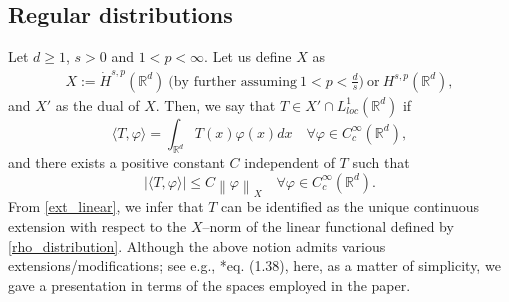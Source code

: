 \documentclass[letterpaper, 11pt,  reqno]{amsart}
\theoremstyle{definition}
\theoremstyle{remark}
\numberwithin{equation}{section}
\newcommand{\bbr}{\mathbb{R}}
\newcommand{\R}{{\mathbb R}}
\begin{document}
	\subsection*{Regular distributions}
	\noindent
	Let $d\ge 1$, $s>0$ and $1<p<\infty$. Let us define $X$ as 
	\begin{align}\label{X}
	{X}:= \dot H^{s,p}(\R^d)\ \big(\text{by further assuming}\ 1<p<\tfrac{d}{s}\big)\ \text{or}\ H^{s,p}(\R^d),
	\end{align}
and $X'$ as the dual of $X$. Then, we say that $T\in X{'}\cap L^{1}_{loc}(\R^d)$ if 
	\begin{equation}\label{rho_distribution}
		\langle T,\varphi\rangle=\int_{\bbr^d}T(x)\varphi(x)dx\quad \forall \varphi\in C^{\infty}_c(\bbr^d),
	\end{equation}
and there exists a positive constant $C$ independent of $T$ such that
	\begin{equation}\label{ext_linear}
		|\langle T,\varphi\rangle|\le C\left\|\varphi\right\|_{X} \quad \forall \varphi\in C^{\infty}_c(\bbr^d).
	\end{equation}
	From \eqref{ext_linear}, we infer that $T$ can be identified as the unique continuous extension with respect to the $X$--norm of the linear functional defined by \eqref{rho_distribution}. 
Although the above notion admits various extensions/modifications; see e.g., \cite{mazya}*{eq. \!\!(1.38)}, here, as a matter of simplicity, we gave a presentation in terms of the spaces employed in the paper.
	
	
\end{document}
